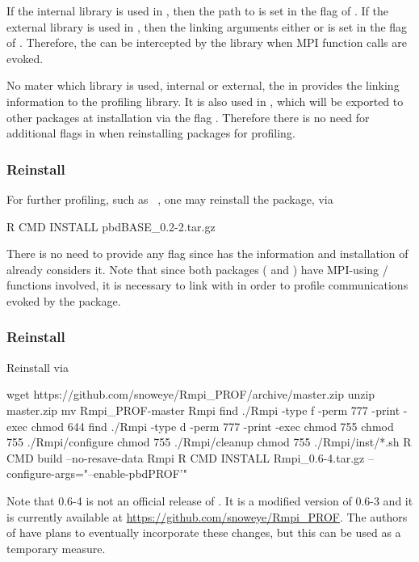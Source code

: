 If the internal library is used in ,
then the path to  is set in the flag
 of .
If the external library is used in ,
then the linking arguments either  or
 is set
in the flag  of .
Therefore, the  can be intercepted by the  library
when MPI function calls are evoked.

No mater which library is used, internal or external, the 
in  provides the linking information to the
profiling library. It is also used in , which will be
exported to other  packages at installation via the flag
.  Therefore there is no need for additional flags in
 when reinstalling packages for profiling.

\subsubsection{Reinstall }
\label{sec:pbdBASE}

For further profiling, such as ~\citep{Schmidt2012pbdBASEpackage}, one may
reinstall the package, via
\begin{Command}
R CMD INSTALL pbdBASE_0.2-2.tar.gz
\end{Command}
There is no need to provide any flag since  has the
information and installation of  already considers it.
Note that since both packages ( and )
have MPI-using / functions involved, it
is necessary to link with  in order to profile communications
evoked by the package.


\subsubsection{Reinstall }
\label{sec:Rmpi}

Reinstall  via
\begin{Command}
wget https://github.com/snoweye/Rmpi_PROF/archive/master.zip
unzip master.zip
mv Rmpi_PROF-master Rmpi
find ./Rmpi -type f -perm 777 -print -exec chmod 644 {} \;
find ./Rmpi -type d -perm 777 -print -exec chmod 755 {} \;
chmod 755 ./Rmpi/configure
chmod 755 ./Rmpi/cleanup
chmod 755 ./Rmpi/inst/*.sh
R CMD build --no-resave-data Rmpi
R CMD INSTALL Rmpi_0.6-4.tar.gz --configure-args="--enable-pbdPROF'"
\end{Command}
Note that {\color{red} 0.6-4} is not an official release of .
It is a modified version of 0.6-3 and it is currently available at
\url{https://github.com/snoweye/Rmpi_PROF}.  The authors of  have plans 
to eventually incorporate these changes, but this can be used as a temporary 
measure.



